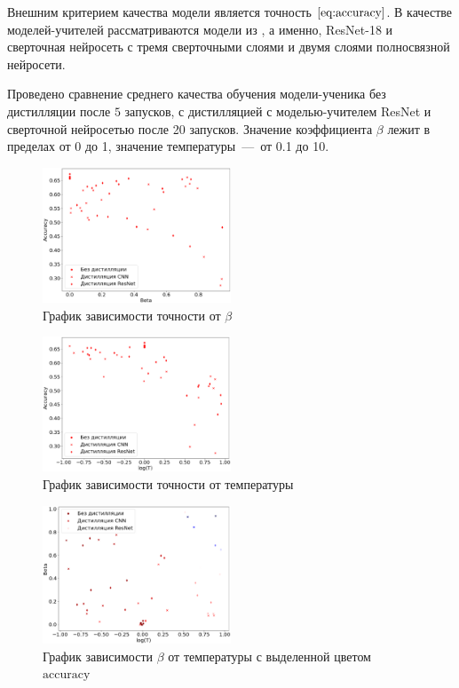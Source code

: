 \documentclass[12pt, twoside]{article}
\begin{document}
Внешним критерием качества модели является точность $\eqref{eq:accuracy}$. В качестве моделей-учителей рассматриваются модели из \cite{conf/cvpr/PassalisTT20}, а именно, ResNet-18 и сверточная нейросеть с тремя сверточными слоями и двумя слоями полносвязной нейросети.

Проведено сравнение среднего качества обучения модели-ученика без дистилляции после $5$ запусков, с дистилляцией с моделью-учителем ResNet и сверточной нейросетью после 20 запусков. Значение коэффициента $\beta$ лежит в пределах от 0 до 1, значение температуры~---~от 0.1 до 10.

\begin{figure}[!ht]
    \centering
    \includegraphics[width=0.5\textwidth]{scatter_beta_acc.eps}
    \caption{График зависимости точности от $\beta$}
    \label{fig:beta_acc}
\end{figure}

\begin{figure}[!ht]
    \centering
    \includegraphics[width=0.5\textwidth]{scatter_temp_acc.eps}
    \caption{График зависимости точности от температуры}
    \label{fig:temp_acc}
\end{figure}

\begin{figure}[!ht]
    \centering
    \includegraphics[width=0.5\textwidth]{scatter_temp_beta.eps}
    \caption{График зависимости $\beta$ от температуры с выделенной цветом $\text{accuracy}$}
    \label{fig:temp_beta}
\end{figure}
\end{document}
